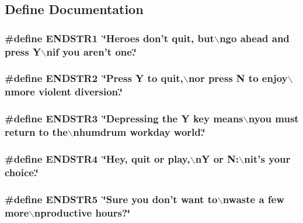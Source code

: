 \subsection{Define Documentation}
\hypertarget{F__SPEAR_8H_a474fc5c034536b0ce10fbd9794cf76b0}{
\subsubsection[{ENDSTR1}]{\setlength{\rightskip}{0pt plus 5cm}\#define ENDSTR1~\char`\"{}Heroes don't quit, but$\backslash$ngo ahead and press Y$\backslash$nif you aren't one.\char`\"{}}}
\label{F__SPEAR_8H_a474fc5c034536b0ce10fbd9794cf76b0}
\hypertarget{F__SPEAR_8H_aabf1f43a65613d40ec516cf92e483c07}{
\subsubsection[{ENDSTR2}]{\setlength{\rightskip}{0pt plus 5cm}\#define ENDSTR2~\char`\"{}Press Y to quit,$\backslash$nor press N to enjoy$\backslash$nmore violent diversion.\char`\"{}}}
\label{F__SPEAR_8H_aabf1f43a65613d40ec516cf92e483c07}
\hypertarget{F__SPEAR_8H_abf7c696b2aa7306caf2f62f5bbc528d9}{
\subsubsection[{ENDSTR3}]{\setlength{\rightskip}{0pt plus 5cm}\#define ENDSTR3~\char`\"{}Depressing the Y key means$\backslash$nyou must return to the$\backslash$nhumdrum workday world.\char`\"{}}}
\label{F__SPEAR_8H_abf7c696b2aa7306caf2f62f5bbc528d9}
\hypertarget{F__SPEAR_8H_a0e396ddcb419c6e76f210a2217ee3489}{
\subsubsection[{ENDSTR4}]{\setlength{\rightskip}{0pt plus 5cm}\#define ENDSTR4~\char`\"{}Hey, quit or play,$\backslash$nY or N:$\backslash$nit's your choice.\char`\"{}}}
\label{F__SPEAR_8H_a0e396ddcb419c6e76f210a2217ee3489}
\hypertarget{F__SPEAR_8H_aa347f66c99d6d6a02e69072252c48dd8}{
\subsubsection[{ENDSTR5}]{\setlength{\rightskip}{0pt plus 5cm}\#define ENDSTR5~\char`\"{}Sure you don't want to$\backslash$nwaste a few more$\backslash$nproductive hours?\char`\"{}}}
